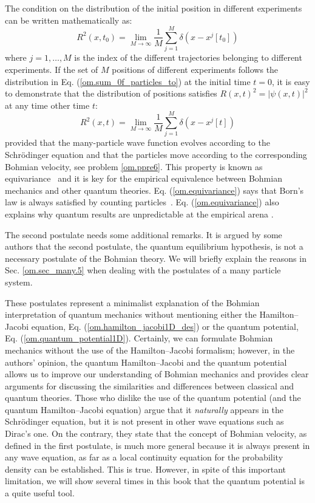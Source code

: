 \documentclass[nofootinbib, secnumarabic, amsmath, nobibnotes,10pt,aps,pra]{revtex4-1}
\newcommand{\sref}[1]{Sec. \ref{#1}}
\newcommand{\eref}[1]{Eq. (\ref{#1})}
\begin{document}
The condition on the distribution of the initial position in different experiments can be written mathematically as:
\begin{equation}
\label{om.sum_0f_particles_to}
R^2(x,t_0) = \lim_{M\rightarrow\infty} \frac {1} {M} \sum_{j = 1}^{M} \delta(x-x^j[t_0])
\end{equation}
where $j = 1,\ldots,M$ is the index of the different trajectories belonging to different experiments. If the set of $M$ positions of different experiments follows the distribution in \eref{om.sum_0f_particles_to} at the initial time $t=0$, it is easy to demonstrate that the distribution of positions satisfies $R(x,t)^2 = |\psi(x,t)|^2$ at any time other time $t$:
\begin{equation}
\label{om.equivariance}
R^2(x,t) = \lim_{M\rightarrow\infty} \frac {1} {M} \sum_{j = 1}^{M} \delta(x-x^j[t])
\end{equation}
provided that the many-particle wave function evolves according to the Schr\"odinger equation and that the particles move according to the corresponding Bohmian velocity, see problem \ref{om.ppre6}. This property is known as equivariance~\cite{om.extra9,om.llibreph} and it is key for the empirical equivalence between Bohmian mechanics and other quantum theories.
\eref{om.equivariance} says that Born's law is always satisfied by counting particles~\cite{om.Holand1993,om.Durrllibre,om.reviewabc,om.llibreph}. 
\eref{om.equivariance} also explains 
why quantum results are unpredictable at the empirical arena \cite{om.randomness}. 

The second postulate needs some additional remarks. It is argued by some authors that the second postulate, the quantum
equilibrium hypothesis, is not a necessary postulate of the Bohmian theory.  We will briefly explain the reasons in \sref{om.sec_many.5} when dealing with the postulates of a many particle system.

These postulates represent a minimalist explanation of the Bohmian
interpretation of quantum mechanics without mentioning either the Hamilton--Jacobi
equation, \eref{om.hamilton_jacobi1D_des} or the quantum potential,
\eref{om.quantum_potential1D}. Certainly, we can formulate Bohmian
mechanics without the use of the Hamilton--Jacobi formalism;
however, in the authors' opinion, the quantum Hamilton--Jacobi and
the quantum potential allows us to improve our understanding of
Bohmian mechanics and provides clear arguments for discussing the
similarities and differences between classical and quantum theories. Those who dislike the use of the quantum potential (and the quantum Hamilton--Jacobi equation) argue that it \emph{naturally} appears in the Schr\"odinger equation, but it is not present in other wave equations such as Dirac's one. On the contrary, they state that the concept of Bohmian velocity, as defined in the first postulate, is much more general because it is always present in any wave equation, as far as a local continuity equation for the probability density can be established. This is true. However, in spite of this important limitation, we will show several times in this book that the quantum potential is a quite useful tool. 
\end{document}
